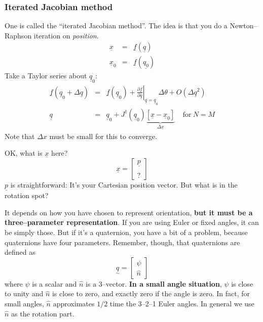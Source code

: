\documentclass[]{article}
\begin{document}
\subsubsection{Iterated Jacobian method}
One is called the ``iterated Jacobian method''. The idea is that you do a Newton--Raphson iteration on \textit{position}.
\begin{eqnarray}
	\underline{x} & = & \underline{f}(\underline{q}) \nonumber \\
	\underline{x}_{0} & = & \underline{f}(\underline{q_{0}}) \nonumber
\end{eqnarray}
Take a Taylor series about $\underline{q}_{0}$:
\begin{eqnarray}
	\underline{f}(\underline{q}_{0}+\Delta \underline{q}) & = & \underline{f}(\underline{q}_{0}) + \left.\frac{\partial \underline{f}}{\partial\underline{q}}\right\rvert_{\underline{q}=\underline{q}_{0}}\!\!\!\!\Delta \theta + O(\Delta \underline{q}^{2}) \nonumber \\
	\underline{q} & = & \underline{q}_{0}+J^{\dag}(\underline{q}_{0})\underbrace{\left[\underline{x}-\underline{x}_{0}\right]}_{\Delta\underline{x}}\ \ \ \ \ \text{for}\ N=M
\end{eqnarray}
Note that $\Delta x$ must be small for this to converge.

OK, what is $\underline{x}$ here? 
\begin{displaymath}
\underline{x} = \left[ \begin{array}{c} \underline{p} \\ \\? \end{array}\right]
\end{displaymath}
$\underline{p}$ is straightforward: It's your Cartesian position vector. But what is in the rotation spot?

It depends on how you have chosen to represent orientation, \textbf{but it must be a three--parameter representation}. If you are using Euler or fixed angles, it can be simply those. But if it's a quaternion, you have a bit of a problem, because quaternions have four parameters. Remember, though, that quaternions are defined as 
\begin{displaymath}
	\underset{\sim}{q} = \left[ \begin{array}{c} \psi \\ \hat{n} \end{array} \right]
\end{displaymath}
where $\psi$ is a scalar and $\hat{n}$ is a 3--vector. \textbf{In a small angle situation}, $\psi$ is close to unity and $\hat{n}$ is close to zero, and exactly zero if the angle is zero. In fact, for small angles, $\hat{n}$ approximates $1/2$ time the 3--2--1 Euler angles.  In general we use $\hat{n}$ as the rotation part.
\end{document}
